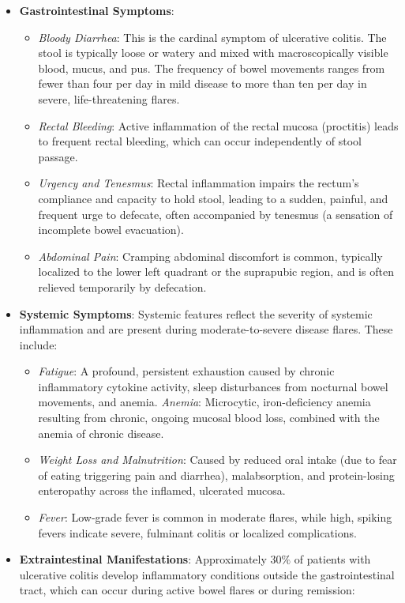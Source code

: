 \begin{itemize}
  \item \textbf{Gastrointestinal Symptoms}:
  \begin{itemize}
    \item \textit{Bloody Diarrhea}: This is the cardinal symptom of ulcerative colitis. The stool is typically loose or watery and mixed with macroscopically visible blood, mucus, and pus. The frequency of bowel movements ranges from fewer than four per day in mild disease to more than ten per day in severe, life-threatening flares.
    \item \textit{Rectal Bleeding}: Active inflammation of the rectal mucosa (proctitis) leads to frequent rectal bleeding, which can occur independently of stool passage.
    \item \textit{Urgency and Tenesmus}: Rectal inflammation impairs the rectum's compliance and capacity to hold stool, leading to a sudden, painful, and frequent urge to defecate, often accompanied by tenesmus (a sensation of incomplete bowel evacuation).
    \item \textit{Abdominal Pain}: Cramping abdominal discomfort is common, typically localized to the lower left quadrant or the suprapubic region, and is often relieved temporarily by defecation.
  \end{itemize}
  \item \textbf{Systemic Symptoms}: Systemic features reflect the severity of systemic inflammation and are present during moderate-to-severe disease flares. These include:
  \begin{itemize}
    \item \textit{Fatigue}: A profound, persistent exhaustion caused by chronic inflammatory cytokine activity, sleep disturbances from nocturnal bowel movements, and anemia.
    \textit{Anemia}: Microcytic, iron-deficiency anemia resulting from chronic, ongoing mucosal blood loss, combined with the anemia of chronic disease.
    \item \textit{Weight Loss and Malnutrition}: Caused by reduced oral intake (due to fear of eating triggering pain and diarrhea), malabsorption, and protein-losing enteropathy across the inflamed, ulcerated mucosa.
    \item \textit{Fever}: Low-grade fever is common in moderate flares, while high, spiking fevers indicate severe, fulminant colitis or localized complications.
  \end{itemize}
  \item \textbf{Extraintestinal Manifestations}: Approximately $30\%$ of patients with ulcerative colitis develop inflammatory conditions outside the gastrointestinal tract, which can occur during active bowel flares or during remission:

\end{itemize}
